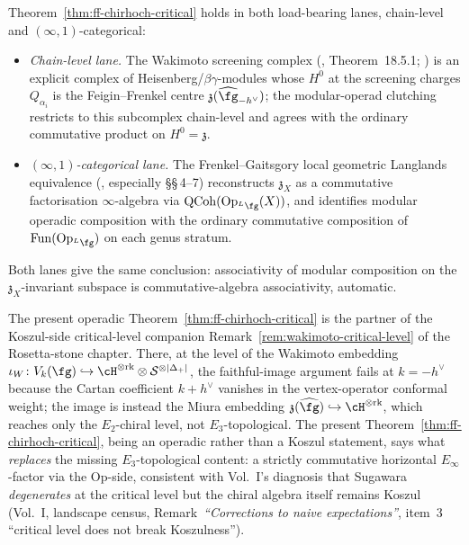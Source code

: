 \begin{remark}
\label{rem:ff-chirhoch-critical-lane-consistency}
%
%
Theorem~\ref{thm:ff-chirhoch-critical} holds in both load-bearing
lanes, chain-level and $(\infty,1)$-categorical:
\begin{itemize}
\item \emph{Chain-level lane.} The Wakimoto screening complex
(\cite{FBZ04}, Theorem~18.5.1; \cite{FF92}) is an explicit complex
of Heisenberg/$\beta\gamma$-modules whose $H^0$ at the screening
charges $Q_{\alpha_i}$ is the Feigin--Frenkel centre
$\mathfrak{z}(\widehat{\fg}_{-h^\vee})$; the modular-operad clutching
restricts to this subcomplex chain-level and agrees with the
ordinary commutative product on $H^0 = \mathfrak{z}$.
\item \emph{$(\infty,1)$-categorical lane.} The
Frenkel--Gaitsgory local geometric Langlands equivalence
(\cite{FG06}, especially \S\S\,4--7) reconstructs
$\mathfrak{z}_X$ as a commutative factorisation
$\infty$-algebra via $\mathrm{QCoh}(\mathrm{Op}_{{}^L\fg}(X))$, and
identifies modular operadic composition with the ordinary
commutative composition of $\mathrm{Fun}(\mathrm{Op}_{{}^L\fg})$ on
each genus stratum.
\end{itemize}
Both lanes give the same conclusion: associativity of modular
composition on the $\mathfrak{z}_X$-invariant subspace is
commutative-algebra associativity, automatic.
\end{remark}

\begin{remark}
\label{rem:vol1-critical-level-companion}
%
The present operadic Theorem~\ref{thm:ff-chirhoch-critical} is
the partner of the Koszul-side critical-level companion
Remark~\ref{rem:wakimoto-critical-level} of the Rosetta-stone
chapter. There, at the level of
the Wakimoto embedding $\iota_W \colon V_k(\fg) \hookrightarrow
\cH^{\otimes\mathrm{rk}}\otimes\cS^{\otimes|\Delta_+|}$, the
faithful-image argument fails at $k=-h^\vee$ because the Cartan
coefficient $k+h^\vee$ vanishes in the vertex-operator conformal
weight; the image is instead the Miura embedding
$\mathfrak{z}(\widehat{\fg})\hookrightarrow \cH^{\otimes\mathrm{rk}}$,
which reaches only the $E_2$-chiral level, not $E_3$-topological.
The present Theorem~\ref{thm:ff-chirhoch-critical}, being an
operadic rather than a Koszul statement, says what \emph{replaces}
the missing $E_3$-topological content: a strictly commutative
horizontal $E_\infty$-factor via the Op-side, consistent with Vol.~I's
diagnosis that Sugawara \emph{degenerates} at the critical level
but the chiral algebra itself remains Koszul (Vol.~I,
landscape census, Remark~\emph{``Corrections to naive expectations''},
item~3 ``critical level does not break Koszulness'').
\end{remark}


